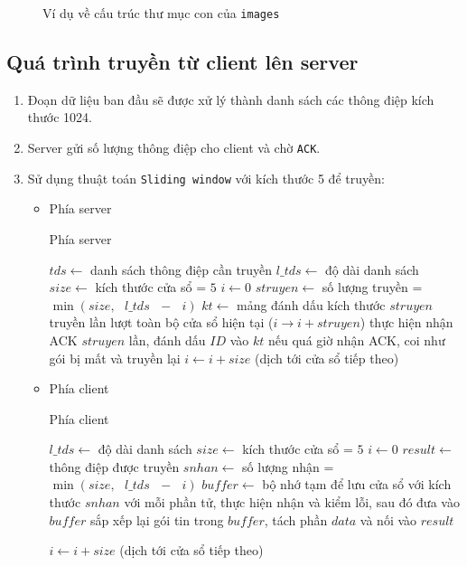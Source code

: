 \begin{figure}[H]
\caption{Ví dụ về cấu trúc thư mục con của \texttt{images}}
\end{figure}

\subsection{Quá trình truyền từ client lên server}
\begin{enumerate}
\item Đoạn dữ liệu ban đầu sẽ được xử lý thành danh sách các thông điệp kích thước 1024.
\item Server gửi số lượng thông điệp cho client và chờ \texttt{ACK}.
\item Sử dụng thuật toán \texttt{Sliding window} với kích thước 5 để truyền:
\begin{itemize}
\item Phía server
\begin{breakablealgorithm}
  \caption{Phía server}
  \begin{algorithmic}[1]
	\State $tds \gets $ danh sách thông điệp cần truyền
	\State $l\_tds \gets $ độ dài danh sách
    \State $size \gets $ kích thước cửa sổ = $5$
    \State $i \gets 0 $
    	\State $struyen \gets $ số lượng truyền = $\min\left( {size,{\text{ }}l\_tds{\text{ }} - {\text{ }}i} \right)$
    	\State $kt \gets$ mảng đánh dấu kích thước $struyen$
    		\State truyền lần lượt toàn bộ cửa sổ hiện tại ($i \to i + struyen$)
    		\State thực hiện nhận ACK $struyen$ lần, đánh dấu $ID$ vào $kt$
    		\State nếu quá giờ nhận ACK, coi như gói bị mất và truyền lại
    	\EndWhile
    	\State $i \gets i + size$ (dịch tới cửa sổ tiếp theo)
    \EndWhile
    \EndFunction
  \end{algorithmic}
\end{breakablealgorithm}
\item Phía client
\begin{breakablealgorithm}
  \caption{Phía client}
  \begin{algorithmic}[1]

	\State $l\_tds \gets $ độ dài danh sách
    \State $size \gets $ kích thước cửa sổ = $5$
    \State $i \gets 0 $
    \State $result \gets $ thông điệp được truyền
    	\State $snhan \gets $ số lượng nhận = $\min\left( {size,{\text{ }}l\_tds{\text{ }} - {\text{ }}i} \right)$
    	\State $buffer \gets$ bộ nhớ tạm để lưu cửa sổ với kích thước $snhan$
    		\State với mỗi phần tử, thực hiện nhận và kiểm lỗi, sau đó đưa vào $buffer$
    	\EndWhile
    	\State sắp xếp lại gói tin trong $buffer$, tách phần $data$ và nối vào $result$

    	\State $i \gets i + size$ (dịch tới cửa sổ tiếp theo)
    \EndWhile
    \EndFunction
  \end{algorithmic}
\end{breakablealgorithm}
\end{itemize}
\end{enumerate}